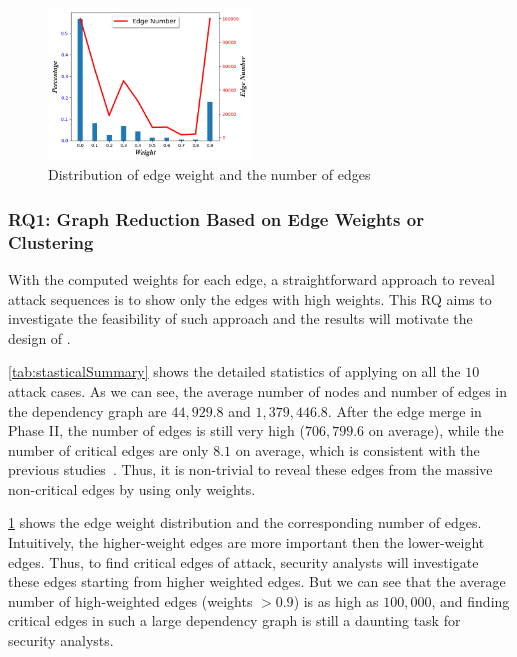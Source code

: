 \begin{figure}
    \centering
    \includegraphics[width=0.48\textwidth]{figs/usenix/rq1weight.png}
    \caption{Distribution of edge weight and the number of edges}
    \label{fig:edgeWeight}
\end{figure}

\subsubsection{RQ1: Graph Reduction Based on Edge Weights or Clustering}
\label{subsubsec:rq1}

With the computed weights for each edge, a straightforward approach to reveal attack sequences is to show only the edges with high weights.
This RQ aims to investigate the feasibility of such approach and the results will motivate the design of \tool.

\cref{tab:stasticalSummary} shows the detailed statistics of applying \tool on all the $10$ attack cases. 
As we can see, the average number of nodes and number of edges in the dependency graph are $44,929.8$ and $1,379,446.8$.
After the edge merge in Phase II, the number of edges is still very high ($706,799.6$ on average), while the number of critical edges are only $8.1$ on average, which is consistent with the previous studies~\cite{mcitracking,ma2016protracer,backtracking,backtracking2}.
Thus, it is non-trivial to reveal these edges from the massive non-critical edges by using only weights.

\cref{fig:edgeWeight} shows the edge weight distribution and the corresponding number of edges. Intuitively, the higher-weight edges are more important then the lower-weight edges. Thus, to find critical edges of attack, security analysts will investigate these edges starting from higher weighted edges. But we can see that the average number of high-weighted edges (\ie weights $>0.9$) is as high as $100,000$,
and finding critical edges in such a large dependency graph is still a daunting task for security analysts.

